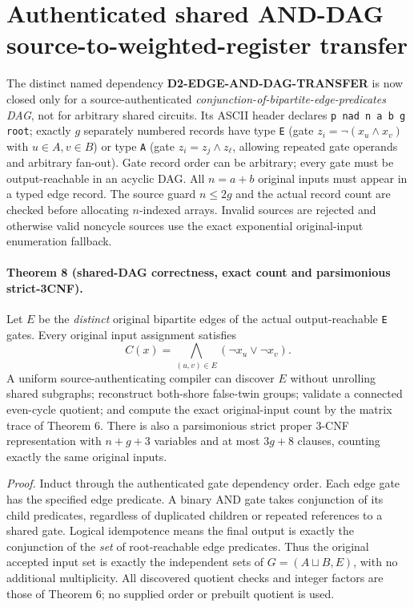 \documentclass[11pt]{article}
\begin{document}
\section{Authenticated shared AND-DAG source-to-weighted-register transfer}
The distinct named dependency \textbf{D2-EDGE-AND-DAG-TRANSFER} is now closed only for a source-authenticated \emph{conjunction-of-bipartite-edge-predicates DAG}, not for arbitrary shared circuits. Its ASCII header declares \texttt{p nad n a b g root}; exactly $g$ separately numbered records have type \texttt{E} (gate $z_i=\neg(x_u\wedge x_v)$ with $u\in A,v\in B$) or type \texttt{A} (gate $z_i=z_j\wedge z_\ell$, allowing repeated gate operands and arbitrary fan-out). Gate record order can be arbitrary; every gate must be output-reachable in an acyclic DAG. All $n=a+b$ original inputs must appear in a typed edge record. The source guard $n\le 2g$ and the actual record count are checked before allocating $n$-indexed arrays. Invalid sources are rejected and otherwise valid noncycle sources use the exact exponential original-input enumeration fallback.

\paragraph{Theorem 8 (shared-DAG correctness, exact count and parsimonious strict-3CNF).}
Let $E$ be the \emph{distinct} original bipartite edges of the actual output-reachable \texttt{E} gates. Every original input assignment satisfies
\[
C(x)=\bigwedge_{(u,v)\in E}(\neg x_u\vee\neg x_v).
\]
A uniform source-authenticating compiler can discover $E$ without unrolling shared subgraphs; reconstruct both-shore false-twin groups; validate a connected even-cycle quotient; and compute the exact original-input count by the matrix trace of Theorem 6. There is also a parsimonious strict proper 3-CNF representation with $n+g+3$ variables and at most $3g+8$ clauses, counting exactly the same original inputs.

\emph{Proof.} Induct through the authenticated gate dependency order. Each edge gate has the specified edge predicate. A binary AND gate takes conjunction of its child predicates, regardless of duplicated children or repeated references to a shared gate. Logical idempotence means the final output is exactly the conjunction of the \emph{set} of root-reachable edge predicates. Thus the original accepted input set is exactly the independent sets of $G=(A\sqcup B,E)$, with no additional multiplicity. All discovered quotient checks and integer factors are those of Theorem 6; no supplied order or prebuilt quotient is used.
\end{document}
